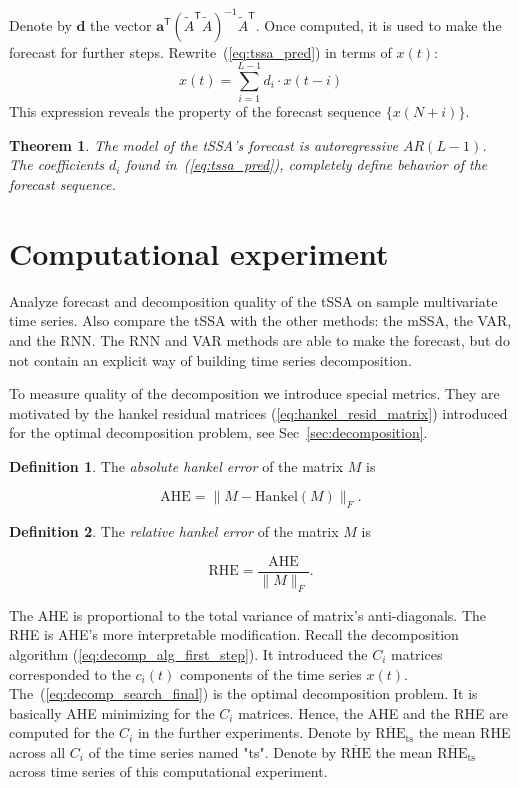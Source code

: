 \documentclass[referee, pdflatex, sn-mathphys-num]{sn-jnl}
\theoremstyle{definition}
\newtheorem{Def}{Definition}
\theoremstyle{plain}
\newtheorem{Th}{Theorem}
\begin{document}
	Denote by $ \mathbf{d} $ the vector $ \mathbf{a}^{\mathsf{T}} (\tilde{A}^{\mathsf{T}} \tilde{A})^{-1} \tilde{A}^{\mathsf{T}} $. Once computed, it is used to make the forecast for further steps. Rewrite~(\ref{eq:tssa_pred}) in terms of $ x(t) $: \begin{equation*}\label{eq:autoregr}
		x(t) = \sum\limits_{i = 1}^{L - 1} d_i \cdot x(t - i)
	\end{equation*}	This expression reveals the property of the forecast sequence $ \{x(N + i)\} $.
	
	\begin{Th}\label{th:forecast}		
		The model of the tSSA's forecast is \emph{autoregressive} $ AR(L - 1) $. The coefficients $ d_i $ found in~(\ref{eq:tssa_pred}), completely define behavior of the forecast sequence.
	\end{Th}
	
	\section{Computational experiment}	
	
	Analyze forecast and decomposition quality of the tSSA on sample multivariate time series. Also compare the tSSA with the other methods: the mSSA, the VAR, and the RNN. The RNN and VAR methods are able to make the forecast, but do not contain an explicit way of building time series decomposition.
	
	To measure quality of the decomposition we introduce special metrics. They are motivated by the hankel residual matrices (\ref{eq:hankel_resid_matrix}) introduced for the optimal decomposition problem, see Sec~\ref{sec:decomposition}.
	
	\begin{Def}
		The \emph{absolute hankel error} of the matrix $ M $ is 
		
		\[
		\text{AHE} = \lVert M - \text{Hankel}(M) \rVert_F.
		\] 
		
	\end{Def}	
	
	\begin{Def}		
		
		The \emph{relative hankel error} of the matrix $ M $ is 
		
		\[
		\text{RHE} = \frac{\text{AHE}}{\lVert M \rVert_F}.
		\] 		
		
	\end{Def}
	
	The AHE is proportional to the total variance of matrix's anti-diagonals. The RHE is AHE's more interpretable modification. Recall the decomposition algorithm (\ref{eq:decomp_alg_first_step}). It introduced the $ C_i $ matrices corresponded to the $ c_i(t) $ components of the time series $ x(t) $. The~(\ref{eq:decomp_search_final}) is the optimal decomposition problem. It is basically AHE minimizing for the $ C_i $ matrices. Hence, the AHE and the RHE are computed for the $ C_i $ in the further experiments. Denote by $ \overline{\text{RHE}}_{\text{ts}} $ the mean RHE across all $ C_i $ of the time series named "ts". Denote by $ \overline{\text{RHE}} $ the mean $ \overline{\text{RHE}}_{\text{ts}} $ across time series of this computational experiment.
	
\end{document}
